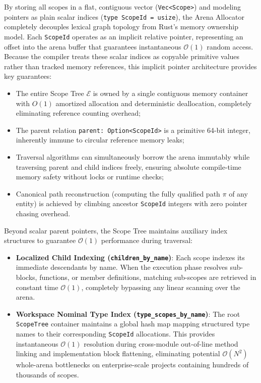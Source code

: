 By storing all scopes in a flat, contiguous vector
(\texttt{Vec<Scope>}) and modeling pointers
as plain scalar indices (\texttt{type ScopeId = usize}), the Arena
Allocator completely decouples lexical graph topology from Rust's memory
ownership model. Each \texttt{ScopeId} operates as an implicit relative
pointer, representing an offset into the arena buffer that guarantees
instantaneous $\mathcal{O}(1)$ random access. Because the compiler treats
these scalar indices as copyable primitive values rather than tracked
memory references, this implicit pointer architecture provides key guarantees:
\begin{itemize}
  \item The entire Scope Tree $\mathcal{E}$ is owned by a single
    contiguous memory container
    with $O(1)$ amortized allocation and deterministic deallocation,
    completely eliminating reference counting overhead;
  \item The parent relation \texttt{parent: Option<ScopeId>} is a
    primitive 64-bit integer,
    inherently immune to circular reference memory leaks;
  \item Traversal algorithms can simultaneously borrow the arena
    immutably \linebreak while traversing parent
    and child indices freely, ensuring absolute compile-time memory
    safety without locks or runtime checks;
  \item Canonical path reconstruction (computing the fully qualified
    path $\pi$ of any entity)
    is achieved by climbing ancestor \texttt{ScopeId} integers with
    zero pointer chasing overhead.
\end{itemize}

Beyond scalar parent pointers, the Scope Tree maintains auxiliary
index structures
to guarantee $\mathcal{O}(1)$ performance during traversal:
\begin{itemize}
  \item \textbf{Localized Child Indexing
    (\texttt{children\_by\_name})}: Each scope
    indexes its immediate descendants by name. When the execution phase resolves
    sub-blocks, functions, or member definitions, matching sub-scopes
    are retrieved
    in constant time $\mathcal{O}(1)$, completely bypassing any
    linear scanning over
    the arena.
  \item \textbf{Workspace Nominal Type Index
    (\texttt{type\_scopes\_by\_name})}: The root
    \texttt{ScopeTree} container maintains a global hash map mapping
    structured type
    names to their corresponding \texttt{ScopeId} allocations. This
    provides instantaneous
    $\mathcal{O}(1)$ resolution during cross-module out-of-line
    method linking and
    implementation block flattening, eliminating potential
    $\mathcal{O}(N^2)$ whole-arena
    bottlenecks on enterprise-scale projects containing hundreds of
    thousands of scopes.
\end{itemize}

